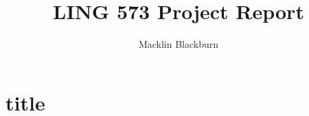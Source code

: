 \documentclass{article}
\begin{document}
	\title{LING 573 Project Report}
	\author{Macklin Blackburn}
	\maketitle
	\section{title}
	
\end{document}
